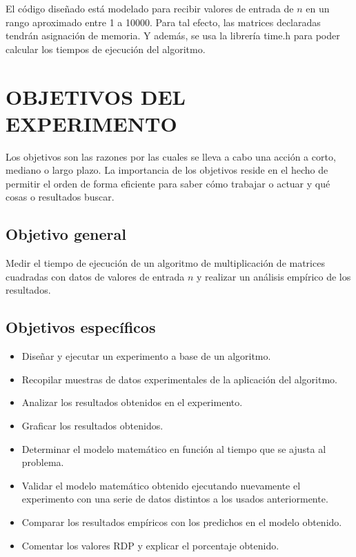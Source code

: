 \documentclass[11pt, twocolumn]{llncs}
\begin{document}
El código diseñado está modelado para recibir valores de entrada de $n$ en un rango aproximado entre 1 a 10000. Para tal efecto, las matrices declaradas tendrán asignación de memoria. Y además, se usa la librería time.h para poder calcular los tiempos de ejecución del algoritmo.

\section{OBJETIVOS DEL EXPERIMENTO}\label{objetivos}
Los objetivos son las razones por las cuales se lleva a cabo una acción a corto, mediano o largo plazo. La importancia de los objetivos reside en el hecho de permitir el orden de forma eficiente para saber cómo trabajar o actuar y qué cosas o resultados buscar.

\subsection{Objetivo general}
Medir el tiempo de ejecución de un algoritmo de multiplicación de matrices cuadradas con datos de valores de entrada $n$ y realizar un análisis empírico de los resultados.

\subsection{Objetivos específicos}
\begin{itemize}
    \item Diseñar y ejecutar un experimento a base de un algoritmo.
    \item Recopilar muestras de datos experimentales de la aplicación del algoritmo.
    \item Analizar los resultados obtenidos en el experimento.
    \item Graficar los resultados obtenidos.
    \item Determinar el modelo matemático en función al tiempo que se ajusta al problema.
    \item Validar el modelo matemático obtenido ejecutando nuevamente el experimento con una serie de datos distintos a los usados anteriormente.
    \item Comparar los resultados empíricos con los predichos en el modelo obtenido.
    \item Comentar los valores RDP y explicar el porcentaje obtenido.
\end{itemize}
\end{document}
